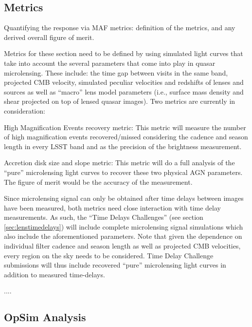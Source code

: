 \subsection{Metrics}
\label{sec:\secname:metrics}

Quantifying the response via MAF metrics: definition of the metrics,
and any derived overall figure of merit.

Metrics for these section need to be defined by using simulated light curves 
that take into account the several parameters that come into play in quasar 
microlensing. These include: the time gap between visits in the same band, 
projected CMB velocity, simulated peculiar velocities and redshifts of lenses 
and sources as well as ``macro'' lens model parameters (i.e., surface mass 
density and shear projected on top of lensed quasar images). Two metrics are 
currently in consideration:

High Magnification Events recovery metric: This metric will measure the number 
of high magnification events recovered/missed considering the cadence and season 
length in every LSST band and as the precision of the brightness measurement.

Accretion disk size and slope metric: This metric will do a full analysis of the 
``pure'' microlensing light curves to recover these two physical AGN parameters. 
The figure of merit would be the accuracy of the measurement.

Since microlensing signal can only be obtained after time delays between images 
have been measured, both metrics need close interaction with time delay 
measurements. As such, the ``Time Delays Challenges'' (see section 
\autoref{sec:lenstimedelays}) will include complete microlensing signal 
simulations which also include the aforementioned parameters. Note that given 
the dependence on individual filter cadence and season length as well as 
projected CMB velocities, every region on the sky needs to be considered. Time 
Delay Challenge submissions will thus include recovered ``pure'' microlensing 
light curves in addition to measured time-delays.


....



\subsection{OpSim Analysis}
\label{sec:\secname:analysis}

